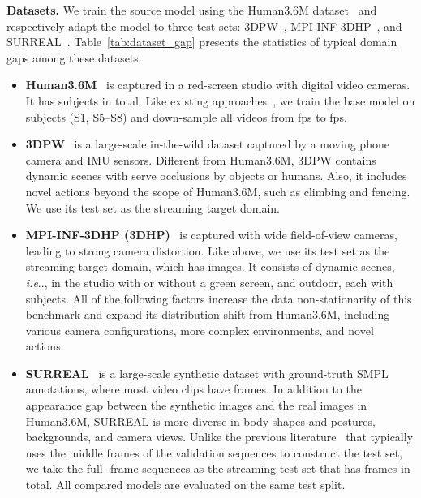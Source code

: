 \documentclass[10pt,journal,compsoc]{IEEEtran}
\makeatletter
\DeclareRobustCommand\onedot{\futurelet\@let@token\@onedot}
\def\@onedot{\ifx\@let@token.\else.\null\fi\xspace}
\def\ie{\emph{i.e}\onedot} \def\Ie{\emph{I.e}\onedot}
\newcommand{\myparagraph}[1]{\vspace{5pt} \noindent \textbf{#1}}
\makeatother
\begin{document}
\myparagraph{Datasets.} 
We train the source model  using the Human3.6M dataset~\cite{h36m_pami} and respectively adapt the model to three test sets: 3DPW~\cite{vonMarcard2018}, MPI-INF-3DHP~\cite{mehta2017monocular}, and SURREAL~\cite{varol2017learning}. Table~\ref{tab:dataset_gap} presents the statistics of typical domain gaps among these datasets.
\begin{itemize}[leftmargin=10pt]
    \item \textbf{Human3.6M}~\cite{h36m_pami} is captured in a red-screen studio with  digital video cameras. It has  subjects in total. Like existing approaches~\cite{kocabas2020vibe,kanazawa2018end}, we train the base model on  subjects (S1, S5--S8) and down-sample all videos from fps to fps.
    \item \textbf{3DPW}~\cite{vonMarcard2018} is a large-scale in-the-wild dataset captured by a moving phone camera and IMU sensors. Different from Human3.6M, 3DPW contains dynamic scenes with serve occlusions by objects or humans. Also, it includes novel actions beyond the scope of Human3.6M, such as climbing and fencing. We use its test set as the streaming target domain. 
    \item \textbf{MPI-INF-3DHP (3DHP)}~\cite{mehta2017monocular} is captured with wide field-of-view cameras, leading to strong camera distortion. Like above, we use its test set as the streaming target domain, which has  images. It consists of  dynamic scenes, \ie, in the studio with or without a green screen, and outdoor, each with  subjects. All of the following factors increase the data non-stationarity of this benchmark and expand its distribution shift from Human3.6M, including various camera configurations, more complex environments, and novel actions.
    \item \textbf{SURREAL}~\cite{varol2017learning} is a large-scale synthetic dataset with ground-truth SMPL annotations, where most video clips have  frames. In addition to the appearance gap between the synthetic images and the real images in Human3.6M, SURREAL is more diverse in body shapes and postures, backgrounds, and camera views. Unlike the previous literature~\cite{varol2018bodynet,zeng20203d} that typically uses the middle frames of the validation sequences to construct the test set, we take the full -frame sequences as the streaming test set that has  frames in total. All compared models are evaluated on the same test split.
\end{itemize}
\end{document}
